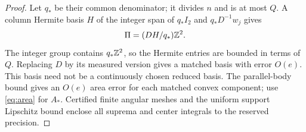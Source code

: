 \begin{proof}
Let $q_*$ be their common denominator; it divides $n$ and is at most
$Q$. A column Hermite basis $H$ of the integer span of $q_*I_2$ and
$q_*D^{-1}w_j$ gives
\begin{equation}\label{eq:hermite}
                  \Pi=(DH/q_*)\mathbb Z^2.
\end{equation}
The integer group contains $q_*\mathbb Z^2$, so the Hermite entries are
bounded in terms of $Q$. Replacing $D$ by its measured version gives
a matched basis with error $O(e)$. This basis need not be a continuously
chosen reduced basis. The parallel-body bound gives an $O(e)$ area
error for each matched convex component; use \eqref{eq:area} for
$A_*$. Certified finite angular meshes and the uniform support Lipschitz
bound enclose all suprema and center integrals to the reserved precision.
\end{proof}
